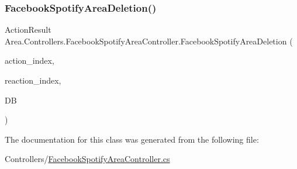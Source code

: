 \mbox{\label{classArea_1_1Controllers_1_1FacebookSpotifyAreaController_ad03e220743db8b630b3f36e9f3e5dfcd}} 
\subsubsection{\texorpdfstring{Facebook\+Spotify\+Area\+Deletion()}{FacebookSpotifyAreaDeletion()}}
{\footnotesize\ttfamily Action\+Result Area.\+Controllers.\+Facebook\+Spotify\+Area\+Controller.\+Facebook\+Spotify\+Area\+Deletion (\begin{DoxyParamCaption}\item[{string}]{action\+\_\+index,  }\item[{string}]{reaction\+\_\+index,  }\item[{\mbox{[}\+From\+Services\mbox{]} \mbox{\hyperlink{classArea_1_1DAT_1_1AreaDbContext}{Area\+Db\+Context}}}]{DB }\end{DoxyParamCaption})\hspace{0.3cm}{\ttfamily [inline]}}



The documentation for this class was generated from the following file\+:\begin{DoxyCompactItemize}
\item 
Controllers/\mbox{\hyperlink{FacebookSpotifyAreaController_8cs}{Facebook\+Spotify\+Area\+Controller.\+cs}}\end{DoxyCompactItemize}

